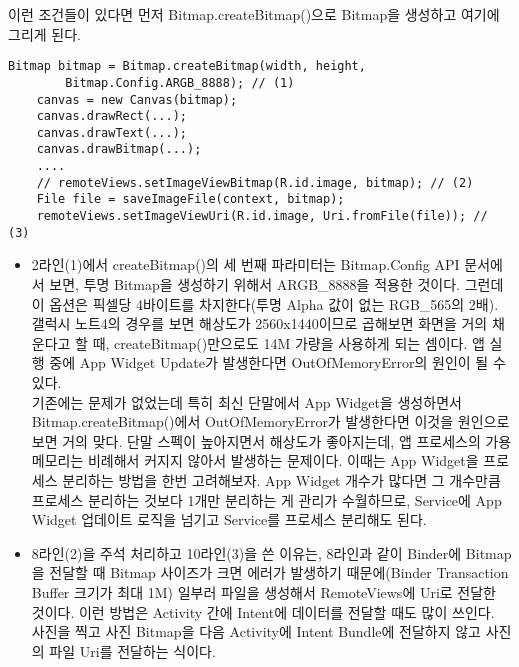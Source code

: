 이런 조건들이 있다면 먼저 Bitmap.createBitmap()으로 Bitmap을 생성하고 여기에 그리게 된다.
\begin{lstlisting}[frame=single] 
	Bitmap bitmap = Bitmap.createBitmap(width, height, 
		Bitmap.Config.ARGB_8888); // (1)
	canvas = new Canvas(bitmap);
	canvas.drawRect(...);
	canvas.drawText(...);
	canvas.drawBitmap(...);
	....
	// remoteViews.setImageViewBitmap(R.id.image, bitmap); // (2)
	File file = saveImageFile(context, bitmap);
	remoteViews.setImageViewUri(R.id.image, Uri.fromFile(file)); // (3)
\end{lstlisting}
\begin{itemize}
\item 2라인(1)에서 createBitmap()의 세 번째 파라미터는 Bitmap.Config API 문서에서 보면, 투명 Bitmap을 생성하기 위해서 ARGB\_8888을 적용한 것이다.
그런데 이 옵션은 픽셀당 4바이트를 차지한다(투명 Alpha 값이 없는 RGB\_565의 2배). 갤럭시 노트4의 경우를 보면 해상도가 2560x1440이므로 곱해보면 화면을 거의 채운다고 할 때, createBitmap()만으로도 14M 가량을 사용하게 되는 셈이다. 
앱 실행 중에 App Widget Update가 발생한다면 OutOfMemoryError의 원인이 될 수 있다.\\

기존에는 문제가 없었는데 특히 최신 단말에서 App Widget을 생성하면서 Bitmap.createBitmap()에서 OutOfMemoryError가 발생한다면 이것을 원인으로 보면 거의 맞다.
단말 스펙이 높아지면서 해상도가 좋아지는데, 앱 프로세스의 가용 메모리는 비례해서 커지지 않아서 발생하는 문제이다.
이때는 App Widget을 프로세스 분리하는 방법을 한번 고려해보자.
App Widget 개수가 많다면 그 개수만큼 프로세스 분리하는 것보다 1개만 분리하는 게 관리가 수월하므로, Service에 App Widget 업데이트 로직을 넘기고 Service를 프로세스 분리해도 된다.

\item 8라인(2)을 주석 처리하고 10라인(3)을 쓴 이유는, 8라인과 같이 Binder에 Bitmap을 전달할 때 Bitmap 사이즈가 크면 에러가 발생하기 때문에(Binder Transaction Buffer 크기가  최대 1M) 일부러 파일을 생성해서 RemoteViews에 Uri로 전달한 것이다. 
이런 방법은 Activity 간에 Intent에 데이터를 전달할 때도 많이 쓰인다. 사진을 찍고 사진 Bitmap을 다음 Activity에 Intent Bundle에 전달하지 않고 사진의 파일 Uri를 전달하는 식이다.
\end{itemize}
